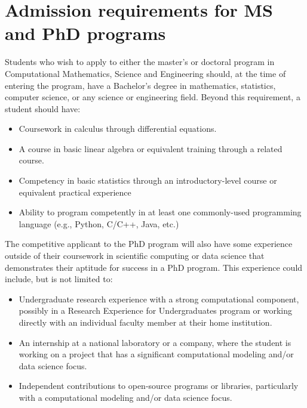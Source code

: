\section{Admission requirements for MS and PhD programs}
\label{sec:grad_admission}

Students who wish to apply to either the master's or doctoral program in Computational
Mathematics, Science and Engineering should, at the time of entering
the program, have a Bachelor's degree in mathematics, statistics,
computer science, or any science or engineering field.  Beyond this
requirement, a student should have:

\begin{itemize}
\item Coursework in calculus through differential equations.

\item A course in basic linear algebra or equivalent training through
  a related course.

\item Competency in basic statistics through an introductory-level
  course or equivalent practical
  experience

\item Ability to program competently in at least one commonly-used programming language
  (e.g., Python, C/C++, Java, etc.)

\end{itemize}

The competitive applicant to the PhD program will also have some experience outside of
their coursework in scientific computing or data science that
demonstrates their aptitude for success in a PhD program.  This
experience could include, but is not limited to:  

\begin{itemize}
\item Undergraduate research experience with a strong computational
  component, possibly in a Research Experience for Undergraduates program or working directly with an
  individual faculty member at their home institution.

\item An internship at a national laboratory or a company, where the
  student is working on a
  project that has a significant computational modeling and/or data
  science focus.

\item Independent contributions to open-source programs or libraries,
  particularly with a computational modeling and/or data science
  focus.
\end{itemize}

